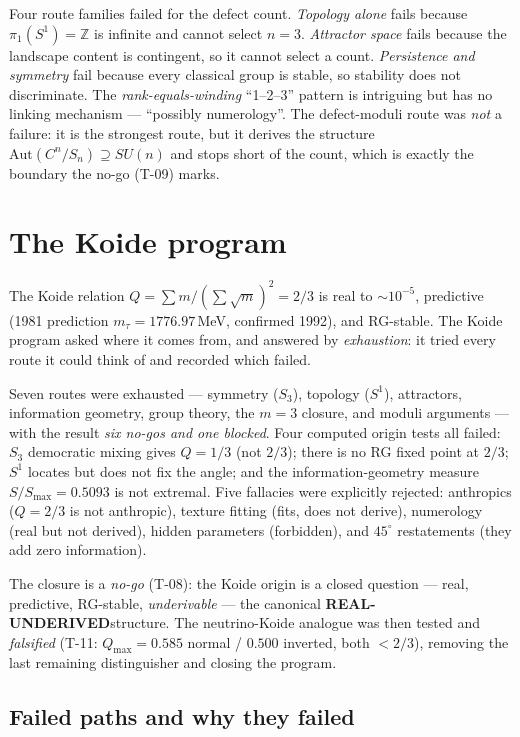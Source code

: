 \documentclass[10pt,twoside,openany]{book}
\newcommand{\realunder}{\textbf{REAL-UNDERIVED}}
\begin{document}
Four route families failed for the defect count. \emph{Topology alone} fails because
$\pi_1(S^1)=\mathbb Z$ is infinite and cannot select $n=3$. \emph{Attractor space} fails
because the landscape content is contingent, so it cannot select a count. \emph{Persistence
and symmetry} fail because every classical group is stable, so stability does not
discriminate. The \emph{rank-equals-winding} ``1--2--3'' pattern is intriguing but has no
linking mechanism --- ``possibly numerology''. The defect-moduli route was \emph{not} a
failure: it is the strongest route, but it derives the structure
$\mathrm{Aut}(C^n/S_n)\supseteq SU(n)$ and stops short of the count, which is exactly the
boundary the no-go (T-09) marks.

\section{The Koide program}

The Koide relation $Q=\sum m/(\sum\sqrt m)^2=2/3$ is real to $\sim10^{-5}$, predictive
(1981 prediction $m_\tau=1776.97$\,MeV, confirmed 1992), and RG-stable. The Koide program
asked where it comes from, and answered by \emph{exhaustion}: it tried every route it
could think of and recorded which failed.

Seven routes were exhausted --- symmetry ($S_3$), topology ($S^1$), attractors,
information geometry, group theory, the $m=3$ closure, and moduli arguments --- with the
result \emph{six no-gos and one blocked}. Four computed origin tests all failed: $S_3$
democratic mixing gives $Q=1/3$ (not $2/3$); there is no RG fixed point at $2/3$; $S^1$
locates but does not fix the angle; and the information-geometry measure
$S/S_{\max}=0.5093$ is not extremal. Five fallacies were explicitly rejected: anthropics
($Q=2/3$ is not anthropic), texture fitting (fits, does not derive), numerology (real but
not derived), hidden parameters (forbidden), and $45^\circ$ restatements (they add zero
information).

The closure is a \emph{no-go} (T-08): the Koide origin is a closed question --- real,
predictive, RG-stable, \emph{underivable} --- the canonical \realunder structure. The
neutrino-Koide analogue was then tested and \emph{falsified} (T-11: $Q_{\max}=0.585$
normal / $0.500$ inverted, both $<2/3$), removing the last remaining distinguisher and
closing the program.

\subsection{Failed paths and why they failed}
\end{document}
